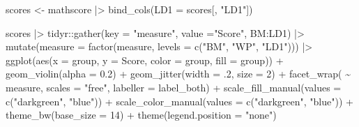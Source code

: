 \documentclass[
  letterpaper,
  10pt,
  krantz2]{krantz}
\makeatletter
\newenvironment{Shaded}{\begin{snugshade}}{\end{snugshade}}
\newcommand{\AttributeTok}[1]{\textcolor[rgb]{0.40,0.45,0.13}{#1}}
\newcommand{\DecValTok}[1]{\textcolor[rgb]{0.68,0.00,0.00}{#1}}
\newcommand{\FloatTok}[1]{\textcolor[rgb]{0.68,0.00,0.00}{#1}}
\newcommand{\FunctionTok}[1]{\textcolor[rgb]{0.28,0.35,0.67}{#1}}
\newcommand{\NormalTok}[1]{\textcolor[rgb]{0.00,0.23,0.31}{#1}}
\newcommand{\OtherTok}[1]{\textcolor[rgb]{0.00,0.23,0.31}{#1}}
\newcommand{\SpecialCharTok}[1]{\textcolor[rgb]{0.37,0.37,0.37}{#1}}
\newcommand{\StringTok}[1]{\textcolor[rgb]{0.13,0.47,0.30}{#1}}
\newenvironment{kframe}{%
  \medskip{}
  \setlength{\fboxsep}{.8em}
  \def\at@end@of@kframe{}%
  \ifinner\ifhmode%
  \def\at@end@of@kframe{\end{minipage}}%
  \begin{minipage}{\columnwidth}%
  \fi\fi%
  \def\FrameCommand##1{\hskip\@totalleftmargin \hskip-\fboxsep
  \colorbox{shadecolor}{##1}\hskip-\fboxsep
      \hskip-\linewidth \hskip-\@totalleftmargin \hskip\columnwidth}%
  \MakeFramed {\advance\hsize-\width
    \@totalleftmargin\z@ \linewidth\hsize
    \@setminipage}}%
{\par\unskip\endMakeFramed%
  \at@end@of@kframe}
\renewenvironment{Shaded}{\begin{kframe}}{\end{kframe}}
\makeatother
\begin{document}
\begin{Shaded}
\begin{Highlighting}[]
\NormalTok{scores }\OtherTok{\textless{}{-}}\NormalTok{ mathscore }\SpecialCharTok{|\textgreater{}}
  \FunctionTok{bind\_cols}\NormalTok{(}\AttributeTok{LD1 =}\NormalTok{ scores[, }\StringTok{"LD1"}\NormalTok{]) }

\NormalTok{scores }\SpecialCharTok{|\textgreater{}}
\NormalTok{  tidyr}\SpecialCharTok{::}\FunctionTok{gather}\NormalTok{(}\AttributeTok{key =} \StringTok{"measure"}\NormalTok{, }\AttributeTok{value =}\StringTok{"Score"}\NormalTok{, BM}\SpecialCharTok{:}\NormalTok{LD1) }\SpecialCharTok{|\textgreater{}}
  \FunctionTok{mutate}\NormalTok{(}\AttributeTok{measure =} \FunctionTok{factor}\NormalTok{(measure, }\AttributeTok{levels =} \FunctionTok{c}\NormalTok{(}\StringTok{"BM"}\NormalTok{, }\StringTok{"WP"}\NormalTok{, }\StringTok{"LD1"}\NormalTok{))) }\SpecialCharTok{|\textgreater{}}
  \FunctionTok{ggplot}\NormalTok{(}\FunctionTok{aes}\NormalTok{(}\AttributeTok{x =}\NormalTok{ group, }\AttributeTok{y =}\NormalTok{ Score, }\AttributeTok{color =}\NormalTok{ group, }\AttributeTok{fill =}\NormalTok{ group)) }\SpecialCharTok{+}
    \FunctionTok{geom\_violin}\NormalTok{(}\AttributeTok{alpha =} \FloatTok{0.2}\NormalTok{) }\SpecialCharTok{+}
    \FunctionTok{geom\_jitter}\NormalTok{(}\AttributeTok{width =}\NormalTok{ .}\DecValTok{2}\NormalTok{, }\AttributeTok{size =} \DecValTok{2}\NormalTok{) }\SpecialCharTok{+}
    \FunctionTok{facet\_wrap}\NormalTok{( }\SpecialCharTok{\textasciitilde{}}\NormalTok{ measure, }\AttributeTok{scales =} \StringTok{"free"}\NormalTok{, }\AttributeTok{labeller =}\NormalTok{ label\_both) }\SpecialCharTok{+}
    \FunctionTok{scale\_fill\_manual}\NormalTok{(}\AttributeTok{values =} \FunctionTok{c}\NormalTok{(}\StringTok{"darkgreen"}\NormalTok{, }\StringTok{"blue"}\NormalTok{)) }\SpecialCharTok{+}
    \FunctionTok{scale\_color\_manual}\NormalTok{(}\AttributeTok{values =} \FunctionTok{c}\NormalTok{(}\StringTok{"darkgreen"}\NormalTok{, }\StringTok{"blue"}\NormalTok{)) }\SpecialCharTok{+}
    \FunctionTok{theme\_bw}\NormalTok{(}\AttributeTok{base\_size =} \DecValTok{14}\NormalTok{) }\SpecialCharTok{+}
    \FunctionTok{theme}\NormalTok{(}\AttributeTok{legend.position =} \StringTok{"none"}\NormalTok{)}
\end{Highlighting}
\end{Shaded}
\end{document}

